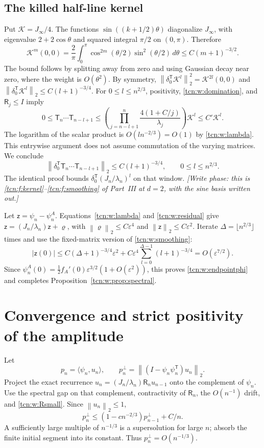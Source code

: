 \documentclass[11pt,letterpaper]{article}
\newcommand{\norm}[1]{\left\lVert#1\right\rVert}
\newcommand{\ip}[2]{\langle#1,#2\rangle}
\newcommand{\eps}{\varepsilon}
\theoremstyle{remark}
\begin{document}
\subsection{The killed half-line kernel}
Put $\mathcal K=J_\infty/4$. The functions $\sin((k+1/2)\theta)$ diagonalize $J_\infty$, with eigenvalue $2+2\cos\theta$ and squared integral $\pi/2$ on $(0,\pi)$. Therefore
\[
 \mathcal K^m(0,0)=\frac2\pi\int_0^\pi
       \cos^{2m}(\theta/2)\sin^2(\theta/2)\,d\theta
       \le C(m+1)^{-3/2}.
\]
The bound follows by splitting away from zero and using Gaussian decay near zero, where the weight is $O(\theta^2)$. By symmetry, $\norm{\delta_0^{\mathsf T}\mathcal K^l}_2^2=\mathcal K^{2l}(0,0)$ and $\norm{\delta_0^{\mathsf T}\mathcal K^l}_2\le C(l+1)^{-3/4}$.
For $0\le l\le n^{2/3}$, positivity, \eqref{tcn:w:domination}, and $\mathsf R_j\le I$ imply
\[
 0\le \mathsf T_n\cdots \mathsf T_{n-l+1}
 \le\left(\prod_{j=n-l+1}^n\frac{4(1+C/j)}{\lambda_j}\right)\mathcal K^l\le C'\mathcal K^l.
\]
The logarithm of the scalar product is $O(ln^{-2/3})=O(1)$ by \eqref{tcn:w:lambda}. This entrywise argument does not assume commutation of the varying matrices. We conclude
\begin{equation}\label{tcn:w:smoothing}
 \norm{\delta_0^{\mathsf T}\mathsf T_n\cdots \mathsf T_{n-l+1}}_2
             \le C(l+1)^{-3/4},\qquad 0\le l\le n^{2/3}.
\end{equation}
The identical proof bounds $\delta_0^{\mathsf T}(J_n/\lambda_n)^l$ on that window. \emph{[Write phase: this is \eqref{tcn:f:kernel}--\eqref{tcn:f:smoothing} of Part~III at $d=2$, with the sine basis written out.]}

Let $\mathsf z=\psi_n-\psi^A_n$. Equations~\eqref{tcn:w:lambda} and \eqref{tcn:w:residual} give
$\mathsf z=(J_n/\lambda_n)\mathsf z+\varrho$, with $\norm{\varrho}_2\le C\eps^4$ and $\norm{\mathsf z}_2\le C\eps^2$.
Iterate $\Delta=\lfloor n^{2/3}\rfloor$ times and use the fixed-matrix version of \eqref{tcn:w:smoothing}:
\[
 |\mathsf z(0)|\le C(\Delta+1)^{-3/4}\eps^2
     +C\eps^4\sum_{l=0}^{\Delta-1}(l+1)^{-3/4}=O(\eps^{7/2}).
\]
Since $\psi^A_n(0)=\tfrac12f_A'(0)\eps^{3/2}(1+O(\eps^2))$, this proves \eqref{tcn:w:endpointphi} and completes Proposition~\ref{tcn:w:prop:spectral}.

\section{Convergence and strict positivity of the amplitude}\label{tcn:w:sec:amplitude}
Let
\[
 p_n=\ip{\psi_n}{u_n},\qquad
 p_n^\perp=\norm{(I-\psi_n\psi_n^{\mathsf T})u_n}_2.
\]
Project the exact recurrence $u_n=(J_n/\lambda_n)\mathsf R_nu_{n-1}$ onto the complement of $\psi_n$. Use the spectral gap on that complement, contractivity of $\mathsf R_n$, the $O(n^{-1})$ drift, and \eqref{tcn:w:Rsmall}. Since $\norm{u_n}_2\le1$,
\begin{equation}\label{tcn:w:perp}
 p_n^\perp\le(1-cn^{-2/3})p_{n-1}^\perp+C/n.
\end{equation}
A sufficiently large multiple of $n^{-1/3}$ is a supersolution for large $n$; absorb the finite initial segment into its constant. Thus $p_n^\perp=O(n^{-1/3})$.
\end{document}
